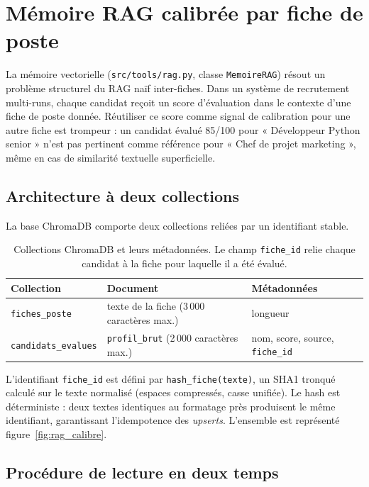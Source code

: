 \section{Mémoire RAG calibrée par fiche de poste}

La mémoire vectorielle (\texttt{src/tools/rag.py}, classe \texttt{MemoireRAG}) résout un problème structurel du RAG naïf inter-fiches. Dans un système de recrutement multi-runs, chaque candidat reçoit un score d'évaluation dans le contexte d'une fiche de poste donnée. Réutiliser ce score comme signal de calibration pour une autre fiche est trompeur : un candidat évalué 85/100 pour « Développeur Python senior » n'est pas pertinent comme référence pour « Chef de projet marketing », même en cas de similarité textuelle superficielle.

\subsection{Architecture à deux collections}

La base ChromaDB comporte deux collections reliées par un identifiant stable.

\begin{table}[H]
\centering
\small
\begin{tabular}{@{}lll@{}}
\toprule
\textbf{Collection} & \textbf{Document} & \textbf{Métadonnées} \\
\midrule
\texttt{fiches\_poste}     & texte de la fiche (3\,000 caractères max.) & longueur \\
\texttt{candidats\_evalues} & \texttt{profil\_brut} (2\,000 caractères max.) & nom, score, source, \texttt{fiche\_id} \\
\bottomrule
\end{tabular}
\caption{Collections ChromaDB et leurs métadonnées. Le champ \texttt{fiche\_id} relie chaque candidat à la fiche pour laquelle il a été évalué.}
\end{table}

L'identifiant \texttt{fiche\_id} est défini par \texttt{hash\_fiche(texte)}, un SHA1 tronqué calculé sur le texte normalisé (espaces compressés, casse unifiée). Le hash est déterministe : deux textes identiques au formatage près produisent le même identifiant, garantissant l'idempotence des \textit{upserts}. L'ensemble est représenté figure~\ref{fig:rag_calibre}.



\subsection{Procédure de lecture en deux temps}

